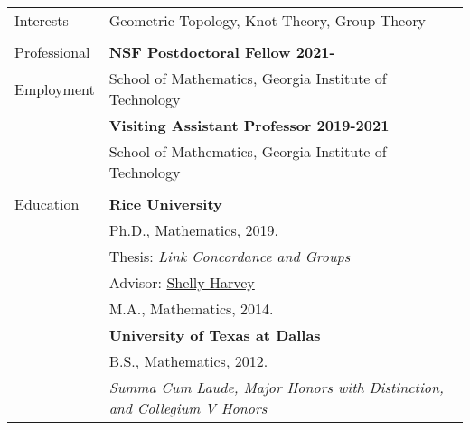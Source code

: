 \documentclass[letterpaper,11pt,oneside]{article}
\begin{document}
\noindent \begin{tabular}{@{} l l}

      \Large{Interests}     & Geometric Topology, Knot Theory, Group Theory\\
     \\

 \Large{Professional}    & \textbf{NSF Postdoctoral Fellow 2021-} \\
     \Large{Employment}   
     & School of Mathematics, Georgia Institute of Technology \\
        & \textbf{Visiting Assistant Professor 2019-2021} \\
        
     & School of Mathematics, Georgia Institute of Technology \\
    
     & \\
 \Large{Education}    & \textbf{Rice University} \\
     & Ph.D., Mathematics, 2019. \\
       & Thesis: \textit{Link Concordance and Groups} \\
     & Advisor: \href{www.math.rice.edu/~shelly}{Shelly Harvey} \\
     & M.A., Mathematics, 2014. \\
     & \textbf{University of Texas at Dallas} \\
     & B.S., Mathematics, 2012. \\
      & \sl{Summa Cum Laude, Major Honors with Distinction, and Collegium V Honors} \\
      

\end{tabular}
\end{document}
